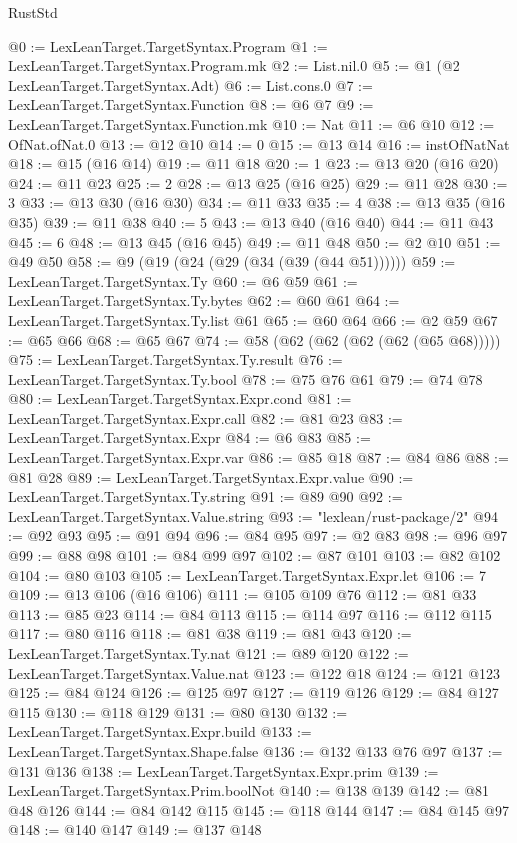 \begin{lexlean}{RustStd}
\begin{coremodule}
{\begin{coremodule}
{{{{{{{{{{{{{{{{{{{{{{{{{{{{{{{{{{{{{{{{{{{{{{{{{{{{{{@0 := LexLeanTarget.TargetSyntax.Program
@1 := LexLeanTarget.TargetSyntax.Program.mk
@2 := List.nil.{0}
@5 := @1 (@2 LexLeanTarget.TargetSyntax.Adt)
@6 := List.cons.{0}
@7 := LexLeanTarget.TargetSyntax.Function
@8 := @6 @7
@9 := LexLeanTarget.TargetSyntax.Function.mk
@10 := Nat
@11 := @6 @10
@12 := OfNat.ofNat.{0}
@13 := @12 @10
@14 := 0
@15 := @13 @14
@16 := instOfNatNat
@18 := @15 (@16 @14)
@19 := @11 @18
@20 := 1
@23 := @13 @20 (@16 @20)
@24 := @11 @23
@25 := 2
@28 := @13 @25 (@16 @25)
@29 := @11 @28
@30 := 3
@33 := @13 @30 (@16 @30)
@34 := @11 @33
@35 := 4
@38 := @13 @35 (@16 @35)
@39 := @11 @38
@40 := 5
@43 := @13 @40 (@16 @40)
@44 := @11 @43
@45 := 6
@48 := @13 @45 (@16 @45)
@49 := @11 @48
@50 := @2 @10
@51 := @49 @50
@58 := @9 (@19 (@24 (@29 (@34 (@39 (@44 @51))))))
@59 := LexLeanTarget.TargetSyntax.Ty
@60 := @6 @59
@61 := LexLeanTarget.TargetSyntax.Ty.bytes
@62 := @60 @61
@64 := LexLeanTarget.TargetSyntax.Ty.list @61
@65 := @60 @64
@66 := @2 @59
@67 := @65 @66
@68 := @65 @67
@74 := @58 (@62 (@62 (@62 (@62 (@65 @68)))))
@75 := LexLeanTarget.TargetSyntax.Ty.result
@76 := LexLeanTarget.TargetSyntax.Ty.bool
@78 := @75 @76 @61
@79 := @74 @78
@80 := LexLeanTarget.TargetSyntax.Expr.cond
@81 := LexLeanTarget.TargetSyntax.Expr.call
@82 := @81 @23
@83 := LexLeanTarget.TargetSyntax.Expr
@84 := @6 @83
@85 := LexLeanTarget.TargetSyntax.Expr.var
@86 := @85 @18
@87 := @84 @86
@88 := @81 @28
@89 := LexLeanTarget.TargetSyntax.Expr.value
@90 := LexLeanTarget.TargetSyntax.Ty.string
@91 := @89 @90
@92 := LexLeanTarget.TargetSyntax.Value.string
@93 := "lexlean/rust-package/2"
@94 := @92 @93
@95 := @91 @94
@96 := @84 @95
@97 := @2 @83
@98 := @96 @97
@99 := @88 @98
@101 := @84 @99 @97
@102 := @87 @101
@103 := @82 @102
@104 := @80 @103
@105 := LexLeanTarget.TargetSyntax.Expr.let
@106 := 7
@109 := @13 @106 (@16 @106)
@111 := @105 @109 @76
@112 := @81 @33
@113 := @85 @23
@114 := @84 @113
@115 := @114 @97
@116 := @112 @115
@117 := @80 @116
@118 := @81 @38
@119 := @81 @43
@120 := LexLeanTarget.TargetSyntax.Ty.nat
@121 := @89 @120
@122 := LexLeanTarget.TargetSyntax.Value.nat
@123 := @122 @18
@124 := @121 @123
@125 := @84 @124
@126 := @125 @97
@127 := @119 @126
@129 := @84 @127 @115
@130 := @118 @129
@131 := @80 @130
@132 := LexLeanTarget.TargetSyntax.Expr.build
@133 := LexLeanTarget.TargetSyntax.Shape.false
@136 := @132 @133 @76 @97
@137 := @131 @136
@138 := LexLeanTarget.TargetSyntax.Expr.prim
@139 := LexLeanTarget.TargetSyntax.Prim.boolNot
@140 := @138 @139
@142 := @81 @48 @126
@144 := @84 @142 @115
@145 := @118 @144
@147 := @84 @145 @97
@148 := @140 @147
@149 := @137 @148
}}}}}}}}}}}}}}}}}}}}}}}}}}}}}}}}}}}}}}}}}}}}}}}}}}}}}}
\end{coremodule}}
\end{coremodule}
\end{lexlean}
